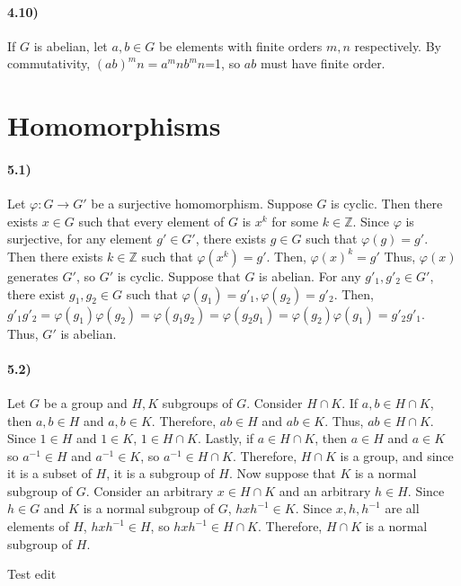 \documentclass{article}
\begin{document}
\paragraph{4.10)}

If $G$ is abelian, let $a,b\in G$ be elements with finite orders $m,n$ respectively. By commutativity, $(ab)^mn=a^mnb^mn$=1, so $ab$ must have finite order.

\section{Homomorphisms}

\paragraph{5.1)}
Let $\varphi :G\to G'$ be a surjective homomorphism. Suppose $G$ is cyclic. Then there exists $x\in G$ such that every element of $G$ is $x^k$ for some $k\in \mathbb{Z}$. Since $\varphi$ is surjective, for any element $g'\in G'$, there exists $g\in G$ such that $\varphi (g)=g'$. Then there exists $k\in \mathbb{Z}$ such that $\varphi (x^k)=g'$. Then, $\varphi (x)^k=g'$ Thus, $\varphi (x)$ generates $G'$, so $G'$ is cyclic.\newline
Suppose that $G$ is abelian. For any $g'_1,g'_2\in G'$, there exist $g_1,g_2\in G$ such that $\varphi (g_1)=g'_1, \varphi (g_2)=g'_2$. Then, $g'_1g'_2=\varphi (g_1)\varphi (g_2)=\varphi (g_1g_2)=\varphi(g_2g_1)=\varphi (g_2)\varphi (g_1)=g'_2g'_1$. Thus, $G'$ is abelian.

\paragraph{5.2)}
Let $G$ be a group and $H,K$ subgroups of $G$. Consider $H\cap K$. If $a,b\in H\cap K$, then $a,b\in H$ and $a,b\in K$. Therefore, $ab\in H$ and $ab\in K$. Thus, $ab\in H\cap K$. Since $1\in H$ and $1\in K$, $1\in H\cap K$. Lastly, if $a\in H\cap K$, then $a\in H$ and $a\in K$ so $a^{-1}\in H$ and $a^{-1}\in K$, so $a^{-1}\in H\cap K$. Therefore, $H\cap K$ is a group, and since it is a subset of $H$, it is a subgroup of $H$.\newline
Now suppose that $K$ is a normal subgroup of $G$. Consider an arbitrary $x\in H\cap K$ and an arbitrary $h\in H$. Since $h\in G$ and $K$ is a normal subgroup of $G$, $hxh^{-1}\in K$. Since $x,h,h^{-1}$ are all elements of $H$,  $hxh^{-1}\in H$, so $hxh^{-1}\in H\cap K$. Therefore, $H\cap K$ is a normal subgroup of $H$.

\newline Test edit
\end{document}
